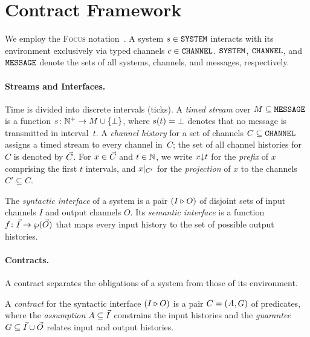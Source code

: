 \section{Contract Framework}\label{sec:contracts}

We employ the \textsc{Focus} notation~\cite{BroyStolen2001}. A system ${s} \in \texttt{SYSTEM}$ interacts with its environment exclusively via typed channels $c \in \texttt{CHANNEL}$. $\texttt{SYSTEM}$, $\texttt{CHANNEL}$, and $\texttt{MESSAGE}$ denote the sets of all systems, channels, and messages, respectively.

\paragraph{Streams and Interfaces.} Time is divided into discrete intervals (ticks). A \emph{timed stream} over $M \subseteq \texttt{MESSAGE}$ is a function $s\colon \mathbb{N}^{+} \to M \cup \{\bot\}$, where $s(t) = \bot$ denotes that no message is transmitted in interval~$t$. A \emph{channel history} for a set of channels $C \subseteq \texttt{CHANNEL}$ assigns a timed stream to every channel in~$C$; the set of all channel histories for $C$ is denoted by $\vec{C}$. For $x \in \vec{C}$ and $t \in \mathbb{N}$, we write $x{\downarrow}t$ for the \emph{prefix} of $x$ comprising the first $t$ intervals, and $x|_{C'}$ for the \emph{projection} of $x$ to the channels $C' \subseteq C$.

The \emph{syntactic interface} of a system is a pair $(I \triangleright O)$ of disjoint sets of input channels $I$ and output channels $O$. Its \emph{semantic interface} is a function $f\colon \vec{I} \to \wp(\vec{O})$ that maps every input history to the set of possible output histories.

\paragraph{Contracts.} A contract separates the obligations of a system from those of its environment.

\begin{definition}\label{def:contract}
  A \emph{contract} for the syntactic interface $(I \triangleright O)$ is a pair $C = (A,G)$ of predicates, where the \emph{assumption} $A \subseteq \vec{I}$ constrains the input histories and the \emph{guarantee} $G \subseteq \vec{I} \cup \vec{O}$ relates input and output histories.
\end{definition}

